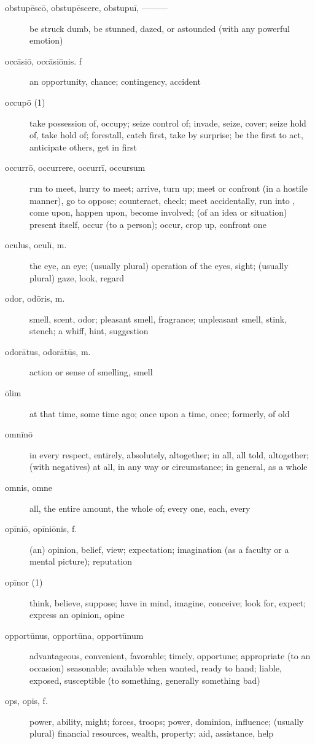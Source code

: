 \begin{description}
    \item[obstupēscō, obstupēscere, obstupuī, ———] be struck dumb, be stunned, dazed, or astounded (with any powerful emotion)
    \item[occāsiō, occāsiōnis. f] an opportunity, chance; contingency, accident
    \item[occupō (1)] take possession of, occupy; seize control of; invade, seize, cover; seize hold of, take hold of; forestall, catch first, take by surprise; be the first to act, anticipate others, get in first
    \item[occurrō, occurrere, occurrī, occursum] run to meet, hurry to meet; arrive, turn up; meet or confront (in a hostile manner), go to oppose; counteract, check; meet accidentally, run into , come upon, happen upon, become involved; (of an idea or situation) present itself, occur (to a person); occur, crop up, confront one
    \item[oculus, oculī, m.] the eye, an eye; (usually plural) operation of the eyes, sight; (usually plural) gaze, look, regard
    \item[odor, odōris, m.] smell, scent, odor; pleasant smell, fragrance; unpleasant smell, stink, stench; a whiff, hint, suggestion
    \item[odorātus, odorātūs, m.] action or sense of smelling, smell
    \item[ōlim] at that time, some time ago; once upon a time, once; formerly, of old
    \item[omnīnō] in every respect, entirely, absolutely, altogether; in all, all told, altogether; (with negatives) at all, in any way or circumstance; in general, as a whole
    \item[omnis, omne] all, the entire amount, the whole of; every one, each, every
    \item[opīniō, opīniōnis, f.] (an) opinion, belief, view; expectation; imagination (as a faculty or a mental picture); reputation
    \item[opīnor (1)] think, believe, suppose; have in mind, imagine, conceive; look for, expect; express an opinion, opine
    \item[opportūnus, opportūna, opportūnum] advantageous, convenient, favorable; timely, opportune; appropriate (to an occasion) seasonable; available when wanted, ready to hand; liable, exposed, susceptible (to something, generally something bad)
    \item[ops, opis, f.] power, ability, might; forces, troops; power, dominion, influence; (usually plural) financial resources, wealth, property; aid, assistance, help

\end{description}
